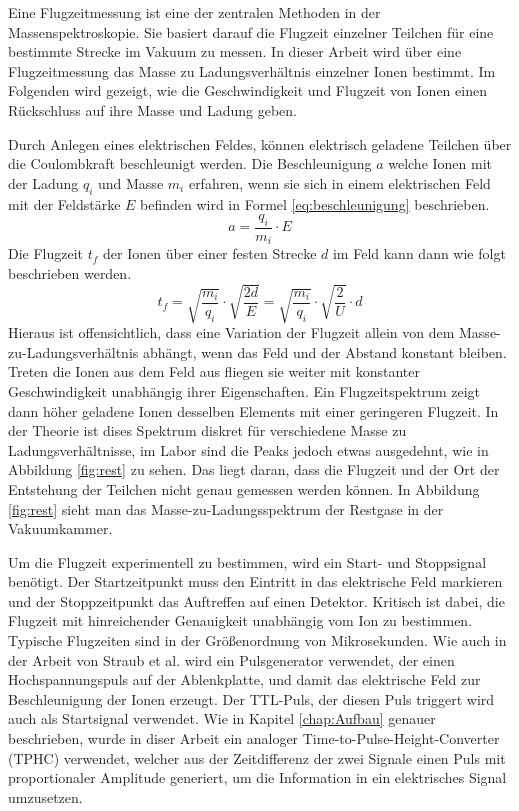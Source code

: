 Eine Flugzeitmessung ist eine der zentralen Methoden in der Massenspektroskopie. Sie basiert darauf die Flugzeit einzelner Teilchen für eine bestimmte Strecke im Vakuum zu messen. In dieser Arbeit wird über eine Flugzeitmessung das Masse zu Ladungsverhältnis einzelner Ionen bestimmt. Im Folgenden wird gezeigt, wie die Geschwindigkeit und Flugzeit von Ionen einen Rückschluss auf ihre Masse und Ladung geben.

Durch Anlegen eines elektrischen Feldes, können elektrisch geladene Teilchen über die Coulombkraft beschleunigt werden. Die Beschleunigung $a$ welche Ionen mit der Ladung $q_i$ und Masse $m_i$ erfahren, wenn sie sich in einem elektrischen Feld mit der Feldstärke $E$ befinden wird in Formel \ref{eq:beschleunigung} beschrieben. 
\begin{equation}
    \label{eq:beschleunigung}
    a = \frac{q_i}{m_i} \cdot E
\end{equation}
Die Flugzeit $t_f$ der Ionen über einer festen Strecke $d$ im Feld kann dann wie folgt beschrieben werden.
\begin{equation}
    t_f = \sqrt{\frac{m_i}{q_i}} \cdot \sqrt{\frac{2d}{E}} = \sqrt{\frac{m_i}{q_i}} \cdot \sqrt{\frac{2}{U}} \cdot d
\end{equation}
Hieraus ist offensichtlich, dass eine Variation der Flugzeit allein von dem Masse-zu-Ladungsverhältnis abhängt, wenn das Feld und der Abstand konstant bleiben. Treten die Ionen aus dem Feld aus fliegen sie weiter mit konstanter Geschwindigkeit unabhängig ihrer Eigenschaften. Ein Flugzeitspektrum zeigt dann höher geladene Ionen desselben Elements mit einer geringeren Flugzeit. In der Theorie ist dises Spektrum diskret für verschiedene Masse zu Ladungsverhältnisse, im Labor sind die Peaks jedoch etwas ausgedehnt, wie in Abbildung \ref{fig:rest} zu sehen. Das liegt daran, dass die Flugzeit und der Ort der Entstehung der Teilchen nicht genau gemessen werden können. In Abbildung \ref{fig:rest} sieht man das Masse-zu-Ladungsspektrum der Restgase in der Vakuumkammer. 

Um die Flugzeit experimentell zu bestimmen, wird ein Start- und Stoppsignal benötigt. Der Startzeitpunkt muss den Eintritt in das elektrische Feld markieren und der Stoppzeitpunkt das Auftreffen auf einen Detektor. Kritisch ist dabei, die Flugzeit mit hinreichender Genauigkeit unabhängig vom Ion zu bestimmen. Typische Flugzeiten sind in der Größenordnung von Mikrosekunden. Wie auch in der Arbeit von Straub et al. wird ein Pulsgenerator verwendet, der einen Hochspannungspuls auf der Ablenkplatte, und damit das elektrische Feld zur Beschleunigung der Ionen erzeugt. Der TTL-Puls, der diesen Puls triggert wird auch als Startsignal verwendet. Wie in Kapitel \ref{chap:Aufbau} genauer beschrieben, wurde in diser Arbeit ein analoger Time-to-Pulse-Height-Converter (TPHC) verwendet, welcher aus der Zeitdifferenz der zwei Signale einen Puls mit proportionaler Amplitude generiert, um die Information in ein elektrisches Signal umzusetzen.

